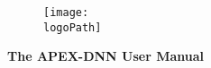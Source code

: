 \documentclass[oneside]{book}
\newcommand{\docTitleLineOne}{The APEX-DNN User Manual}    %
\newcommand{\docTitleLineTwo}{}          %
\newcommand{\logoPath}{../../../../../script/doxygen/NXP_logo_RGB_512x960.pdf}   %
\newcommand{\+}{\discretionary{\mbox{\scriptsize$\hookleftarrow$}}{}{}}
\begin{document}
\pagestyle{empty} %

\begin{figure}
	\centering
	\texttt{[image: \\logoPath]}
\end{figure}

\vspace*{2.5cm}
\begin{flushright}
	\Huge
	\textbf{ \docTitleLineOne} \vspace*{0.4cm} \\ 
	\textbf{ \docTitleLineTwo} \\
	\huge
	\vspace*{2.0cm}
\end{flushright}
\vspace*{2.4cm}
\end{document}
